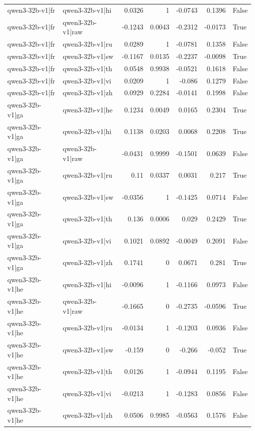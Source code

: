 \begin{table}
\begin{tabular}{l l r r r r l}
qwen3-32b-v1|fr & qwen3-32b-v1|hi & 0.0326 & 1 & -0.0743 & 0.1396 & False \\
qwen3-32b-v1|fr & qwen3-32b-v1|raw & -0.1243 & 0.0043 & -0.2312 & -0.0173 & True \\
qwen3-32b-v1|fr & qwen3-32b-v1|ru & 0.0289 & 1 & -0.0781 & 0.1358 & False \\
qwen3-32b-v1|fr & qwen3-32b-v1|sw & -0.1167 & 0.0135 & -0.2237 & -0.0098 & True \\
qwen3-32b-v1|fr & qwen3-32b-v1|th & 0.0548 & 0.9938 & -0.0521 & 0.1618 & False \\
qwen3-32b-v1|fr & qwen3-32b-v1|vi & 0.0209 & 1 & -0.086 & 0.1279 & False \\
qwen3-32b-v1|fr & qwen3-32b-v1|zh & 0.0929 & 0.2284 & -0.0141 & 0.1998 & False \\
qwen3-32b-v1|ga & qwen3-32b-v1|he & 0.1234 & 0.0049 & 0.0165 & 0.2304 & True \\
qwen3-32b-v1|ga & qwen3-32b-v1|hi & 0.1138 & 0.0203 & 0.0068 & 0.2208 & True \\
qwen3-32b-v1|ga & qwen3-32b-v1|raw & -0.0431 & 0.9999 & -0.1501 & 0.0639 & False \\
qwen3-32b-v1|ga & qwen3-32b-v1|ru & 0.11 & 0.0337 & 0.0031 & 0.217 & True \\
qwen3-32b-v1|ga & qwen3-32b-v1|sw & -0.0356 & 1 & -0.1425 & 0.0714 & False \\
qwen3-32b-v1|ga & qwen3-32b-v1|th & 0.136 & 0.0006 & 0.029 & 0.2429 & True \\
qwen3-32b-v1|ga & qwen3-32b-v1|vi & 0.1021 & 0.0892 & -0.0049 & 0.2091 & False \\
qwen3-32b-v1|ga & qwen3-32b-v1|zh & 0.1741 & 0 & 0.0671 & 0.281 & True \\
qwen3-32b-v1|he & qwen3-32b-v1|hi & -0.0096 & 1 & -0.1166 & 0.0973 & False \\
qwen3-32b-v1|he & qwen3-32b-v1|raw & -0.1665 & 0 & -0.2735 & -0.0596 & True \\
qwen3-32b-v1|he & qwen3-32b-v1|ru & -0.0134 & 1 & -0.1203 & 0.0936 & False \\
qwen3-32b-v1|he & qwen3-32b-v1|sw & -0.159 & 0 & -0.266 & -0.052 & True \\
qwen3-32b-v1|he & qwen3-32b-v1|th & 0.0126 & 1 & -0.0944 & 0.1195 & False \\
qwen3-32b-v1|he & qwen3-32b-v1|vi & -0.0213 & 1 & -0.1283 & 0.0856 & False \\
qwen3-32b-v1|he & qwen3-32b-v1|zh & 0.0506 & 0.9985 & -0.0563 & 0.1576 & False \\

\end{tabular}
\end{table}
